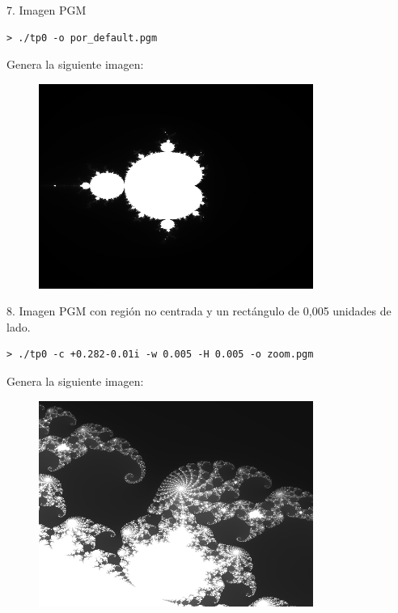 \documentclass[a4paper,10pt]{article}
\begin{document}
7. Imagen PGM
\begin{verbatim}
> ./tp0 -o por_default.pgm
\end{verbatim}
Genera la siguiente imagen:
\begin{figure}
  \begin{center}
    \includegraphics[width=0.8\textwidth]{./por_default.png}
    \label{fig:Region barrida por defecto}
    \caption{}
  \end{center}
\end{figure}



8. Imagen PGM con regi\'on no centrada y un rect\'angulo de 0,005 unidades de lado.
\begin{verbatim}
> ./tp0 -c +0.282-0.01i -w 0.005 -H 0.005 -o zoom.pgm
\end{verbatim}
Genera la siguiente imagen:
\begin{figure}
  \begin{center}
    \includegraphics[width=0.8\textwidth]{./zoom.png}
    \label{fig:Region comprendida entre 0,2795 - 0,0075i y 0,2845 - 0,0125i}
    \caption{}
  \end{center}
\end{figure}
\end{document}
